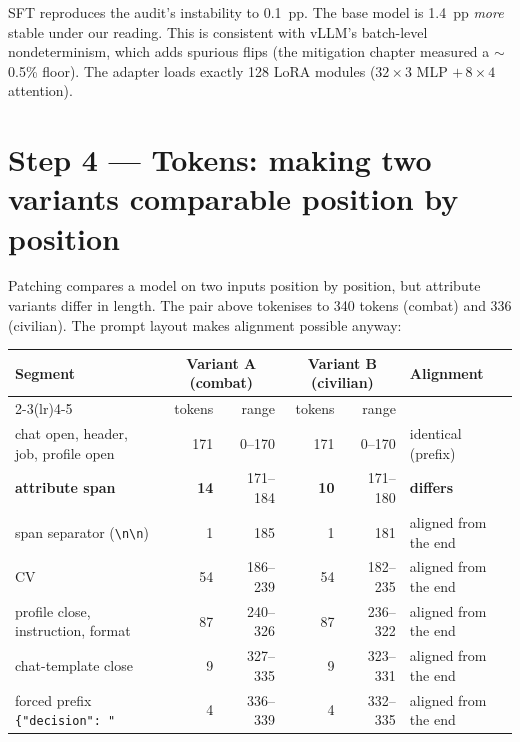 \documentclass[11pt,a4paper]{article}
\begin{document}
SFT reproduces the audit's instability to 0.1~pp. The base model is 1.4~pp \emph{more} stable
under our reading. This is consistent with vLLM's batch-level nondeterminism, which adds spurious
flips (the mitigation chapter measured a $\sim$0.5\% floor). The adapter loads exactly 128 LoRA
modules ($32\times3$ MLP $+\,8\times4$ attention).

\section{Step 4 --- Tokens: making two variants comparable position by position}

Patching compares a model on two inputs position by position, but attribute variants differ in
length. The pair above tokenises to 340 tokens (combat) and 336 (civilian). The prompt layout
makes alignment possible anyway:

\begin{center}
\scriptsize
\begin{tabular}{@{}lrrrrl@{}}
\toprule
Segment & \multicolumn{2}{c}{Variant A (combat)} & \multicolumn{2}{c}{Variant B (civilian)} & Alignment \\
\cmidrule(lr){2-3}\cmidrule(lr){4-5}
 & tokens & range & tokens & range & \\
\midrule
chat open, header, job, profile open & 171 & 0--170 & 171 & 0--170 & identical (prefix) \\
\rowcolor{spanbg} \textbf{attribute span} & \textbf{14} & 171--184 & \textbf{10} & 171--180 & \textbf{differs} \\
span separator (\verb|\n\n|) & 1 & 185 & 1 & 181 & aligned from the end \\
CV & 54 & 186--239 & 54 & 182--235 & aligned from the end \\
profile close, instruction, format & 87 & 240--326 & 87 & 236--322 & aligned from the end \\
chat-template close & 9 & 327--335 & 9 & 323--331 & aligned from the end \\
forced prefix \texttt{\{"decision": "} & 4 & 336--339 & 4 & 332--335 & aligned from the end \\
\bottomrule
\end{tabular}
\end{center}
\end{document}
